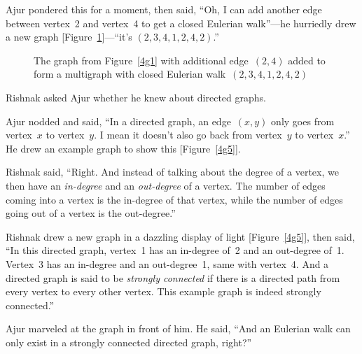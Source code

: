 Ajur pondered this for a moment, then said, ``Oh, I can add another edge between vertex~2 and vertex~4 to get a closed Eulerian walk''---he hurriedly drew a new graph [Figure~\ref{4g155}]---``it's $(2,3,4,1,2,4,2)$.''

\begin{figure}
\begin{center}
\caption{The graph from Figure~\ref{4g1} with additional edge~$(2,4)$ added to form a multigraph with closed Eulerian walk~$(2,3,4,1,2,4,2)$}\label{4g155}
\end{center}
\end{figure}

Rishnak asked Ajur whether he knew about directed graphs.

Ajur nodded and said, ``In a directed graph, an edge~$(x,y)$ only goes from vertex~$x$ to vertex~$y$. I mean it doesn't also go back from vertex~$y$ to vertex~$x$.'' He drew an example graph to show this [Figure~\ref{4g5}].

Rishnak said, ``Right. And instead of talking about the degree of a vertex, we then have an \textit{in-degree} and an \textit{out-degree} of a vertex. The number of edges coming into a vertex is the in-degree of that vertex, while the number of edges going out of a vertex is the out-degree.''

Rishnak drew a new graph in a dazzling display of light [Figure~\ref{4g5}], then said, ``In this directed graph, vertex~1 has an in-degree of~2 and an out-degree of~1. Vertex~3 has an in-degree  and an out-degree~1, same with vertex~4. And a directed graph is said to be \textit{strongly connected} if there is a directed path from every vertex to every other vertex. This example graph is indeed strongly connected.''

Ajur marveled at the graph in front of him.  He said, ``And an Eulerian walk can only exist in a strongly connected directed graph, right?''

